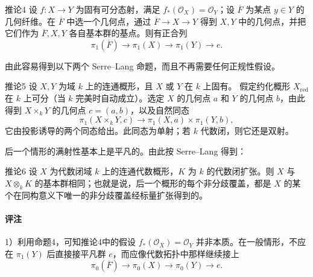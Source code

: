 \begin{statement}{推论4}
设 $f:X\to Y$ 为固有可分态射，满足 $f_*(\mathcal O_X)=\mathcal O_Y$；设 $\overline F$ 为某点 $y\in Y$ 的几何纤维。在 $\overline F$ 中选一个几何点，通过 $\overline F\to X\to Y$ 得到 $X,Y$ 中的几何点，并把它们作为 $\overline F,X,Y$ 各自基本群的基点。则有正合列
\[
\boxed{\pi_1(\overline F)\longrightarrow\pi_1(X)\longrightarrow\pi_1(Y)\longrightarrow e.}
\]
\end{statement}
由此容易得到以下两个 Serre--Lang 命题，而且不再需要任何正规性假设。
\begin{statement}{推论5}
设 $X,Y$ 为域 $k$ 上的连通概形，且 $X$ 或 $Y$ 在 $k$ 上固有。
假定约化概形 $X_{\mathrm{red}}$ 在 $k$ 上可分（当 $k$ 完美时自动成立）。选定 $X$ 的几何点 $a$ 和 $Y$ 的几何点 $b$，由此得到 $X\times_kY$ 的几何点 $c=(a,b)$，以及自然同态
\[
\pi_1(X\times_kY,c)\longrightarrow\pi_1(X,a)\times\pi_1(Y,b),
\]
它由投影诱导的两个同态给出。此同态为单射；若 $k$ 代数闭，则它还是双射。
\end{statement}
后一个情形的满射性基本上是平凡的。由此按 Serre--Lang 得到：
\begin{statement}{推论6}
设 $X$ 为代数闭域 $k$ 上的连通代数概形，$K$ 为 $k$ 的代数闭扩张。则 $X$ 与 $X\otimes_kK$ 的基本群相同；也就是说，后一个概形的每个非分歧覆盖，都是 $X$ 的某个在同构意义下唯一的非分歧覆盖经标量扩张得到的。
\end{statement}
\paragraph{评注}
1）利用命题4，可知推论4中的假设 $f_*(\mathcal O_X)=\mathcal O_Y$ 并非本质。在一般情形，不应在 $\pi_1(Y)$ 后直接接平凡群 $e$，而应像代数拓扑中那样继续接上
\[
\pi_0(\overline F)\longrightarrow\pi_0(X)\longrightarrow\pi_0(Y)\longrightarrow e.
\]

